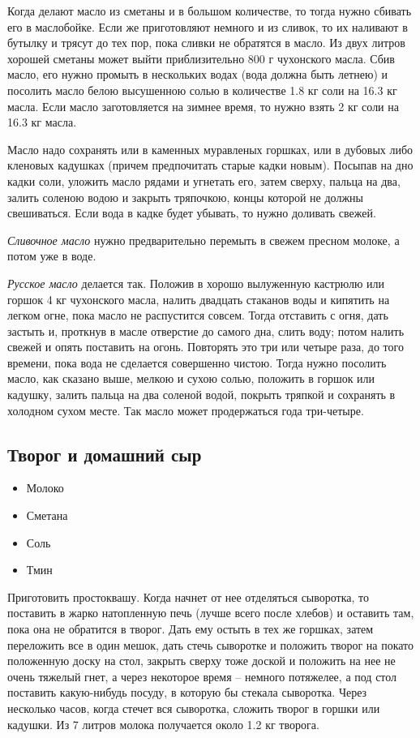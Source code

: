 Когда делают масло из сметаны и в большом количестве, то тогда нужно сбивать его в маслобойке. Если же приготовляют немного и из сливок, то их наливают в бутылку и трясут до тех пор, пока сливки не обратятся в масло. Из двух литров хорошей сметаны может выйти приблизительно 800 г чухонского масла. Сбив масло, его нужно промыть в нескольких водах (вода должна быть летнею) и посолить масло белою высушенною солью в количестве 1.8 кг соли на 16.3 кг масла. Если масло заготовляется на зимнее время, то нужно взять 2 кг соли на 16.3 кг масла.

Масло надо сохранять или в каменных муравленых горшках, или в дубовых либо кленовых кадушках (причем предпочитать старые кадки новым). Посыпав на дно кадки соли, уложить масло рядами и угнетать его, затем сверху, пальца на два, залить соленою водою и закрыть тряпочкою, концы которой не должны свешиваться. Если вода в кадке будет убывать, то нужно доливать свежей.

\emph{Сливочное масло} нужно предварительно перемыть в свежем пресном молоке, а потом уже в воде.

\emph{Русское масло} делается так. Положив в хорошо вылуженную кастрюлю или горшок 4 кг чухонского масла, налить двадцать стаканов воды и кипятить на легком огне, пока масло не распустится совсем. Тогда отставить с огня, дать застыть и, проткнув в масле отверстие до самого дна, слить воду; потом налить свежей и опять поставить на огонь. Повторять это три или четыре раза, до того времени, пока вода не сделается совершенно чистою. Тогда нужно посолить масло, как сказано выше, мелкою и сухою солью, положить в горшок или кадушку, залить пальца на два соленой водой, покрыть тряпкой и сохранять в холодном сухом месте. Так масло может продержаться года три-четыре.

\subsection{Творог и домашний сыр}

\begin{itemize}
	\item Молоко 
    \item Сметана 
    \item Соль 
    \item Тмин
\end{itemize}

Приготовить простоквашу. Когда начнет от нее отделяться сыворотка, то поставить в жарко натопленную печь (лучше всего после хлебов) и оставить там, пока она не обратится в творог. Дать ему остыть в тех же горшках, затем переложить все в один мешок, дать стечь сыворотке и положить творог на покато положенную доску на стол, закрыть сверху тоже доской и положить на нее не очень тяжелый гнет, а через некоторое время – немного потяжелее, а под стол поставить какую-нибудь посуду, в которую бы стекала сыворотка. Через несколько часов, когда стечет вся сыворотка, сложить творог в горшки или кадушки. Из 7 литров молока получается около 1.2 кг творога.

